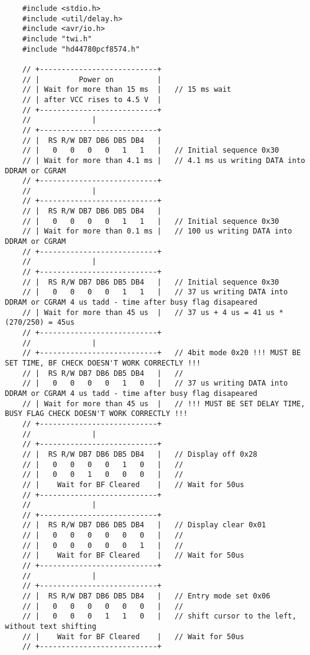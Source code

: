 \begin{lstlisting}
	#include <stdio.h>
	#include <util/delay.h>
	#include <avr/io.h>
	#include "twi.h"
	#include "hd44780pcf8574.h"
	
	// +---------------------------+
	// |         Power on          |
	// | Wait for more than 15 ms  |   // 15 ms wait
	// | after VCC rises to 4.5 V  |
	// +---------------------------+
	//              |
	// +---------------------------+ 
	// |  RS R/W DB7 DB6 DB5 DB4   |   
	// |   0   0   0   0   1   1   |   // Initial sequence 0x30
	// | Wait for more than 4.1 ms |   // 4.1 ms us writing DATA into DDRAM or CGRAM
	// +---------------------------+
	//              |
	// +---------------------------+
	// |  RS R/W DB7 DB6 DB5 DB4   |   
	// |   0   0   0   0   1   1   |   // Initial sequence 0x30
	// | Wait for more than 0.1 ms |   // 100 us writing DATA into DDRAM or CGRAM
	// +---------------------------+
	//              |
	// +---------------------------+
	// |  RS R/W DB7 DB6 DB5 DB4   |   // Initial sequence 0x30
	// |   0   0   0   0   1   1   |   // 37 us writing DATA into DDRAM or CGRAM 4 us tadd - time after busy flag disapeared
	// | Wait for more than 45 us  |   // 37 us + 4 us = 41 us * (270/250) = 45us
	// +---------------------------+  
	//              |
	// +---------------------------+   // 4bit mode 0x20 !!! MUST BE SET TIME, BF CHECK DOESN'T WORK CORRECTLY !!!
	// |  RS R/W DB7 DB6 DB5 DB4   |   // 
	// |   0   0   0   0   1   0   |   // 37 us writing DATA into DDRAM or CGRAM 4 us tadd - time after busy flag disapeared
	// | Wait for more than 45 us  |   // !!! MUST BE SET DELAY TIME, BUSY FLAG CHECK DOESN'T WORK CORRECTLY !!!
	// +---------------------------+
	//              |
	// +---------------------------+
	// |  RS R/W DB7 DB6 DB5 DB4   |   // Display off 0x28
	// |   0   0   0   0   1   0   |   // 
	// |   0   0   1   0   0   0   |   // 
	// |    Wait for BF Cleared    |   // Wait for 50us
	// +---------------------------+
	//              |
	// +---------------------------+
	// |  RS R/W DB7 DB6 DB5 DB4   |   // Display clear 0x01
	// |   0   0   0   0   0   0   |   //
	// |   0   0   0   0   0   1   |   //
	// |    Wait for BF Cleared    |   // Wait for 50us
	// +---------------------------+
	//              |
	// +---------------------------+
	// |  RS R/W DB7 DB6 DB5 DB4   |   // Entry mode set 0x06
	// |   0   0   0   0   0   0   |   // 
	// |   0   0   0   1   1   0   |   // shift cursor to the left, without text shifting
	// |    Wait for BF Cleared    |   // Wait for 50us
	// +---------------------------+
	

\end{lstlisting}
